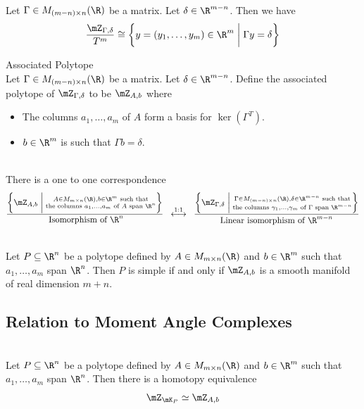 \documentclass[a4paper]{article}
\begin{document}
\begin{lmm}{}{}\\
Let $\Gamma\in M_{(m-n)\times n}(\R)$ be a matrix. Let $\delta\in\R^{m-n}$. Then we have $$\frac{\mZ_{\Gamma,\delta}}{T^m}\cong\left\{y=(y_1,\dots,y_m)\in\R^m\;\bigg{|}\;\Gamma y=\delta\right\}$$
\end{lmm}

\begin{defn}{Associated Polytope}{}\\
Let $\Gamma\in M_{(m-n)\times n}(\R)$ be a matrix. Let $\delta\in\R^{m-n}$. Define the associated polytope of $\mZ_{\Gamma,\delta}$ to be $\mZ_{A,b}$ where 
\begin{itemize}
\item The columns $a_1,\dots,a_m$ of $A$ form a basis for $\ker(\Gamma^T)$. 
\item $b\in\R^m$ is such that $\Gamma b=\delta$. 
\end{itemize}
\end{defn}

\begin{thm}{}{}\\
There is a one to one correspondence $$\frac{\left\{\mZ_{A,b}\;\bigg{|}\;\substack{A\in M_{m\times n}(\R),b\in\R^m\text{ such that}\\\text{the columns }a_1,\dots,a_m\text{ of }A\text{ span }\R^n}\right\}}{\text{ Isomorphism of }\R^n}\;\;\overset{1:1}{\longleftrightarrow}\;\;\frac{\left\{\mZ_{\Gamma,\delta}\;\bigg{|}\;\substack{\Gamma\in M_{(m-n)\times n}(\R),\delta\in\R^{m-n}\text{ such that}\\\text{the columns }\gamma_1,\dots,\gamma_m\text{ of }\Gamma\text{ span }\R^{m-n}}\right\}}{\text{Linear isomorphism of }\R^{m-n}}$$
\end{thm}

\begin{prp}{}{}\\
Let $P\subseteq\R^n$ be a polytope defined by $A\in M_{m\times n}(\R)$ and $b\in\R^m$ such that $a_1,\dots,a_m$ span $\R^n$. Then $P$ is simple if and only if $\mZ_{A,b}$ is a smooth manifold of real dimension $m+n$. 
\end{prp}

\subsection{Relation to Moment Angle Complexes}
\begin{prp}{}{}\\
Let $P\subseteq\R^n$ be a polytope defined by $A\in M_{m\times n}(\R)$ and $b\in\R^m$ such that $a_1,\dots,a_m$ span $\R^n$. Then there is a homotopy equivalence $$\mZ_{\mK_P}\simeq\mZ_{A,b}$$
\end{prp}
\end{document}
